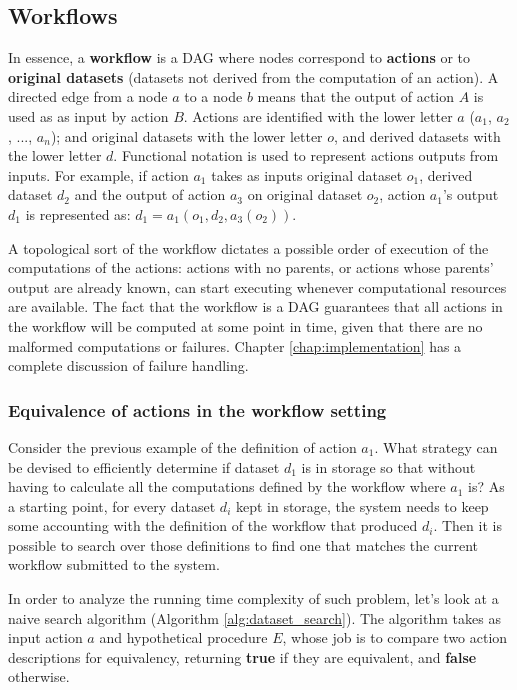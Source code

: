\subsection{Workflows}
In essence, a \textbf{workflow} is a DAG where nodes correspond to \textbf{actions} or to \textbf{original datasets} (datasets not derived from the computation of an action). A directed edge from a node $a$ to a node $b$ means that the output of action $A$ is used as as input by action $B$.  Actions are identified with the lower letter $a$ ($a_1$, $a_2$, ..., $a_n$); and original datasets with the lower letter $o$, and derived datasets with the lower letter $d$.  Functional notation is used to represent actions outputs from inputs.  For example, if action $a_1$ takes as inputs original dataset $o_1$, derived dataset $d_2$ and the output of action $a_3$ on original dataset $o_2$, action $a_1$'s output $d_1$ is represented as: $d_1 = a_1(o_1, d_2, a_3(o_2))$.

A topological sort of the workflow dictates a possible order of execution of the computations of the actions: actions with no parents, or actions whose parents' output are already known, can start executing whenever computational resources are available. The fact that the workflow is a DAG guarantees that all actions in the workflow will be computed at some point in time, given that there are no malformed computations or failures.  Chapter \ref{chap:implementation} has a complete discussion of failure handling.

\subsubsection{Equivalence of actions in the workflow setting}
Consider the previous example of the definition of action $a_1$. What strategy can be devised to efficiently determine if dataset $d_1$ is in storage so that without having to calculate all the computations defined by the workflow where $a_1$ is? As a starting point, for every dataset $d_i$ kept in storage, the system needs to keep some accounting with the definition of the workflow that produced $d_i$.  Then it is possible to search over those definitions to find one that matches the current workflow submitted to the system.  

In order to analyze the running time complexity of such problem, let's look at a naive search algorithm (Algorithm \ref{alg:dataset_search}). The algorithm takes as input action $a$ and hypothetical procedure $E$, whose job is to compare two action descriptions for equivalency, returning \textbf{true} if they are equivalent, and \textbf{false} otherwise.


